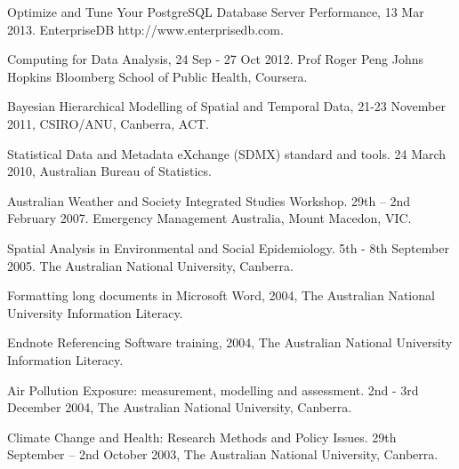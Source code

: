 \documentclass[a4paper,11pt]{article}
\begin{document}
\medskip
\renewcommand{\labelenumi}{\textsc{j}\theenumi.}
\begin{revnumerate}
\item Optimize and Tune Your PostgreSQL Database Server Performance, 13 Mar 2013.  EnterpriseDB http://www.enterprisedb.com. 

\item Computing for Data Analysis, 24 Sep - 27 Oct 2012.  Prof Roger Peng Johns Hopkins Bloomberg School of Public Health, Coursera.

\item Bayesian Hierarchical Modelling of Spatial and Temporal Data, 21-23 November 2011, CSIRO/ANU, Canberra, ACT.

\item Statistical Data and Metadata eXchange (SDMX) standard and tools.  24 March 2010, Australian Bureau of Statistics.

\item Australian Weather and Society Integrated Studies Workshop.  29th – 2nd February 2007.  Emergency Management Australia, Mount Macedon, VIC.

\item Spatial Analysis in Environmental and Social Epidemiology.  5th  - 8th  September 2005. The Australian National University, Canberra.

\item Formatting long documents in Microsoft Word, 2004, The Australian National University Information Literacy.

\item Endnote Referencing Software training, 2004, The Australian National University Information Literacy.

\item Air Pollution Exposure: measurement, modelling and assessment.  2nd - 3rd  December 2004, The Australian National University, Canberra. 

\item Climate Change and Health: Research Methods and Policy Issues.  29th September – 2nd  October 2003, The Australian National University, Canberra.
\end{revnumerate}
\medskip
\end{document}
